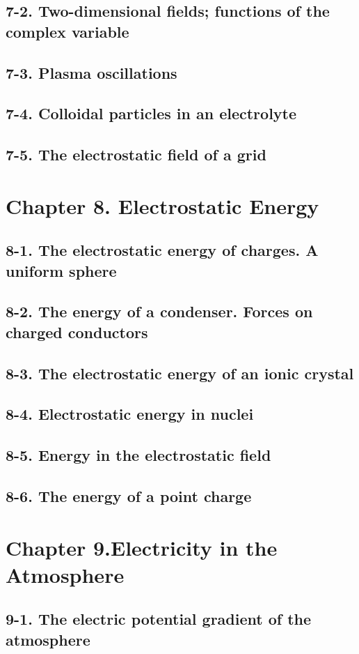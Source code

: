 \documentclass{article}
\begin{document}
\subsection{7-2. Two-dimensional fields; functions of the complex variable}
\subsection{7-3. Plasma oscillations}
\subsection{7-4. Colloidal particles in an electrolyte}
\subsection{7-5. The electrostatic field of a grid}
\section{Chapter 8. Electrostatic Energy}
\subsection{8-1. The electrostatic energy of charges. A uniform sphere}
\subsection{8-2. The energy of a condenser. Forces on charged conductors}
\subsection{8-3. The electrostatic energy of an ionic crystal}
\subsection{8-4. Electrostatic energy in nuclei}
\subsection{8-5. Energy in the electrostatic field}
\subsection{8-6. The energy of a point charge}
\section{Chapter 9.Electricity in the Atmosphere}
\subsection{9-1. The electric potential gradient of the atmosphere}
\end{document}
